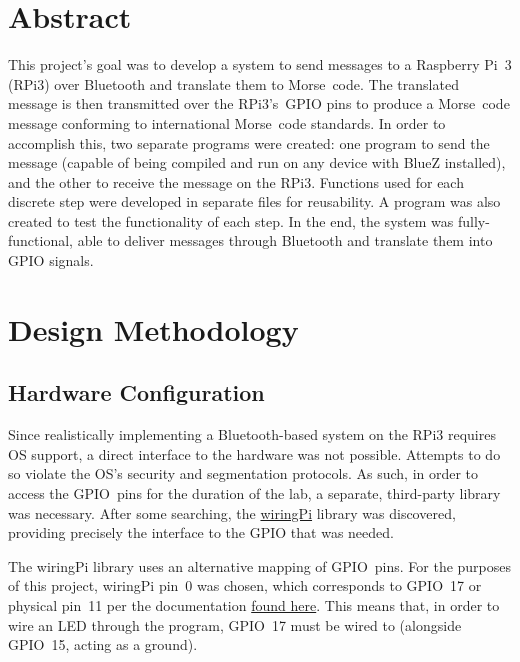 \documentclass[11pt]{article}
\begin{document}


\section{Abstract}
\label{sec:abstract}


This project's goal was to develop a system to send messages to a Raspberry Pi~3 (RPi3) over Bluetooth and translate them to Morse~code.
The translated message is then transmitted over the RPi3's~GPIO pins to produce a Morse~code message conforming to international Morse~code standards.
In order to accomplish this, two separate programs were created: one program to send the message (capable of being compiled and run on any device with BlueZ installed), and the other to receive the message on the RPi3.
Functions used for each discrete step were developed in separate files for reusability.
A program was also created to test the functionality of each step.
In the end, the system was fully-functional, able to deliver messages through Bluetooth and translate them into GPIO signals.


\section{Design Methodology}
\label{sec:design_methodology}




\subsection{Hardware Configuration}
\label{sub:hardware_configuration}


Since realistically implementing a Bluetooth-based system on the RPi3 requires OS support, a direct interface to the hardware was not possible.
Attempts to do so violate the OS's security and segmentation protocols.
As such, in order to access the GPIO~pins for the duration of the lab, a separate, third-party library was necessary.
After some searching, the \href{http://wiringpi.com/}{wiringPi} library was discovered, providing precisely the interface to the GPIO that was needed.


The wiringPi library uses an alternative mapping of GPIO~pins.
For the purposes of this project, wiringPi pin~0 was chosen, which corresponds to GPIO~17 or physical pin~11 per the documentation \href{http://wiringpi.com/pins/}{found here}.
This means that, in order to wire an LED through the program, GPIO~17 must be wired to (alongside GPIO~15, acting as a ground).
\end{document}
